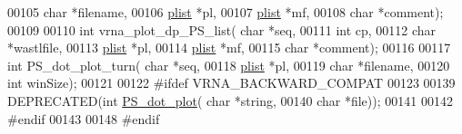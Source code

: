 \begin{DoxyCode}
00105                       \textcolor{keywordtype}{char} *filename,
00106                       \hyperlink{group__data__structures_structvrna__plist__s}{plist} *pl,
00107                       \hyperlink{group__data__structures_structvrna__plist__s}{plist} *mf,
00108                       \textcolor{keywordtype}{char} *comment);
00109 
00110 \textcolor{keywordtype}{int} vrna\_plot\_dp\_PS\_list( \textcolor{keywordtype}{char} *seq,
00111                           \textcolor{keywordtype}{int} cp,
00112                           \textcolor{keywordtype}{char} *wastlfile,
00113                           \hyperlink{group__data__structures_structvrna__plist__s}{plist} *pl,
00114                           \hyperlink{group__data__structures_structvrna__plist__s}{plist} *mf,
00115                           \textcolor{keywordtype}{char} *comment);
00116 
00117 \textcolor{keywordtype}{int} PS\_dot\_plot\_turn( \textcolor{keywordtype}{char} *seq,
00118                       \hyperlink{group__data__structures_structvrna__plist__s}{plist} *pl,
00119                       \textcolor{keywordtype}{char} *filename,
00120                       \textcolor{keywordtype}{int} winSize);
00121 
00122 \textcolor{preprocessor}{#ifdef VRNA\_BACKWARD\_COMPAT}
00123 
00139 DEPRECATED(\textcolor{keywordtype}{int} \hyperlink{group__plotting__utils_ga689a97a7e3b8a2df14728b8204d9d57b}{PS\_dot\_plot}( \textcolor{keywordtype}{char} *\textcolor{keywordtype}{string},
00140                             \textcolor{keywordtype}{char} *file));
00141 
00142 \textcolor{preprocessor}{#endif}
00143 
00148 \textcolor{preprocessor}{#endif}
\end{DoxyCode}
